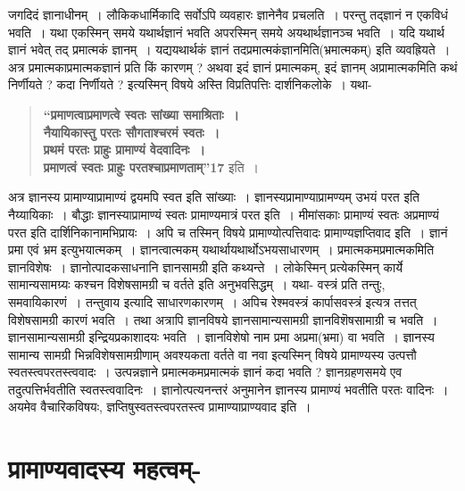 {जगदिदं ज्ञानाधीनम्~। लौकिकधार्मिकादि सर्वोऽपि व्यवहारः ज्ञानेनैव प्रचलति~। परन्तु तद्ज्ञानं न एकविधं भवति~। यथा एकस्मिन् समये यथार्थज्ञानं भवति अपरस्मिन् समये अयथार्थज्ञानञ्च भवति~। यदि यथार्थ ज्ञानं भवेत् तद् प्रमात्मकं ज्ञानम्~। यद्ययथार्थकं ज्ञानं तदप्रमात्मकंज्ञानमिति(भ्रमात्मकम्) इति व्यवह्रियते~। अत्र प्रमात्मकाप्रमात्मकज्ञानं प्रति किं कारणम् ? अथवा इदं ज्ञानं प्रमात्मकम्, इदं ज्ञानम् अप्रामात्मकमिति कथं निर्णीयते ? कदा निर्णीयते ? इत्यस्मिन् विषये अस्ति विप्रतिपत्तिः दार्शनिकलोके~। यथा-
\begin{verse}
\textbf{“प्रमाणत्वाप्रमाणत्वे स्वतः सांख्या समाश्रिताः~। \\
नैयायिकास्तु परतः सौगताश्चरमं स्वतः~। \\
प्रथमं परतः प्राहुः प्रामाण्यं वेदवादिनः~। \\
प्रमाणत्वं स्वतः प्राहुः परतश्चाप्रमाणताम्”17} इति~। 
\end{verse}
अत्र ज्ञानस्य प्रामाण्याप्रामाण्यं द्वयमपि स्वत इति सांख्याः~। ज्ञानस्यप्रामाण्याप्रामण्यम् उभयं परत इति नैय्यायिकाः~। बौद्धाः ज्ञानस्याप्रामाण्यं स्वतः प्रामाण्यमात्रं परत इति~। मीमांसकाः प्रामाण्यं स्वतः अप्रमाण्यं परत इति दार्शिनिकानामभिप्रायः~। अपि च तस्मिन् विषये प्रामाण्योत्पत्तिवादः प्रामाण्यज्ञप्तिवाद इति~। ज्ञानं प्रमा एवं भ्रम इत्युभयात्मकम्~। ज्ञानत्वात्मकम् यथार्थायथार्थोऽभयसाधारणम्~। प्रमात्मकमप्रमात्मकमिति ज्ञानविशेषः~। ज्ञानोत्पादकसाधनानि ज्ञानसामग्री इति कथ्यन्ते~। लोकेस्मिन् प्रत्येकस्मिन् कार्ये सामान्यसामग्र्यः कश्चन विशेषसामग्री च वर्तते इति अनुभवसिद्धम्~। यथा- वस्त्रं प्रति तन्तुः, समवायिकारणं~। तन्तुवाय इत्यादि साधारणकारणम्~। अपिच रेश्मवस्त्रं कार्पासवस्त्रं इत्यत्र तत्तत् विशेषसामग्री कारणं भवति~। तथा अत्रापि ज्ञानविषये ज्ञानसामान्यसामग्री ज्ञानविशॆषसामाग्री च भवति~। ज्ञानसामान्यसामग्री इन्द्रियप्रकाशादयः भवति~। ज्ञानविशेषो नाम प्रमा अप्रमा(भ्रमा) वा भवति~। ज्ञानस्य सामान्य सामग्री भिन्नविशेषसामग्रीणाम् अवश्यकता वर्तते वा नवा इत्यस्मिन् विषये प्रामाण्यस्य उत्पत्तौ स्वतस्त्वपरतस्त्ववादः~। उत्पन्नज्ञाने प्रमात्मकमप्रमात्मकं ज्ञानं कदा भवति ? ज्ञानग्रहणसमये एव तदुत्पत्तिर्भवतीति स्वतस्त्ववादिनः~। ज्ञानोत्पत्यनन्तरं अनुमानेन ज्ञानस्य प्रामाण्यं भवतीति परतः वादिनः~। अयमेव वैचारिकविषयः, ज्ञप्तिषुस्वतस्त्वपरतस्त्व प्रामाण्याप्राण्यवाद इति~। 

\section*{प्रामाण्यवादस्य महत्वम्-}

}

